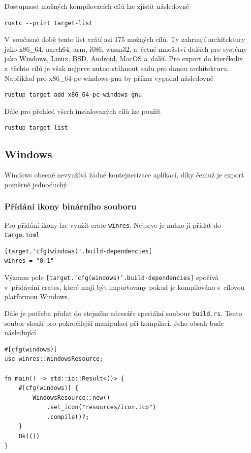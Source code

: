 \documentclass[a4paper, 12pt]{article} %
\begin{document}
	Dostupnost možných kompilovacích cílů lze zjistit následovně
	\begin{verbatim}
rustc --print target-list
	\end{verbatim}
		
	V~současné době tento list vrátí asi 175 možných cílů. Ty zahrnují architektury jako x86\_64, aarch64, arm, i686, wasm32, a~četné množství dalších pro systémy jako Windows, Linux, BSD, Android, MacOS a~další. Pro export do kterékoliv z~těchto cílů je však nejprve nutno stáhnout sadu pro danou architekturu. Například pro x86\_64-pc-windows-gnu by příkaz vypadal následovně
	\begin{verbatim}
rustup target add x86_64-pc-windows-gnu
	\end{verbatim}
	
	Dále pro přehled všech instalovaných cílů lze použít
	\begin{verbatim}
rustup target list
	\end{verbatim}

	\subsection{Windows}
	Windows obecně nevyužívá žádné kontejnerizace aplikací, díky čemuž je export poměrně jednoduchý.
	
	\subsubsection*{Přídání ikony binárního souboru}
		Pro přidání ikony lze využít crate \texttt{winres}. Nejprve je nutno ji přidat do \texttt{Cargo.toml}
		\begin{verbatim}
[target.'cfg(windows)'.build-dependencies]
winres = "0.1"
		\end{verbatim}
		
		Význam pole \texttt{[target.'cfg(windows)'.build-dependencies]} spočívá v~přidávání crates, které mají být importovány pokud je kompilováno s~cílovou platformou Windows.
		
		Dále je potřeba přidat do stejného adresáře speciální soubour \texttt{build.rs}. Tento soubor slouží pro pokročilejší manipulaci při kompilaci. Jeho obsah bude následující
		\begin{verbatim}
#[cfg(windows)]
use winres::WindowsResource;

fn main() -> std::io::Result<()> {
	#[cfg(windows)] {
		WindowsResource::new()
			.set_icon("resources/icon.ico")
			.compile()?;
	}
	Ok(())
}
		\end{verbatim}
\end{document}
